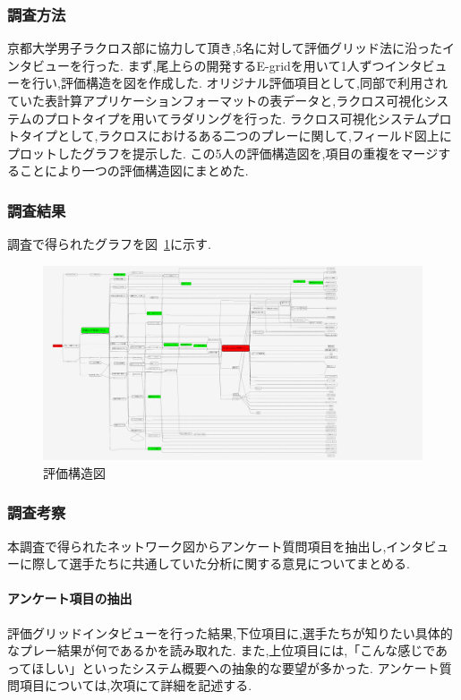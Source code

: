 \documentclass[sotsuron]{kuee}
\begin{document}
			\subsubsection{調査方法}
				京都大学男子ラクロス部に協力して頂き,5名に対して評価グリッド法に沿ったインタビューを行った.
				まず,尾上らの開発するE-gridを用いて1人ずつインタビューを行い,評価構造を図を作成した.
				オリジナル評価項目として,同部で利用されていた表計算アプリケーションフォーマットの表データと,ラクロス可視化システムのプロトタイプを用いてラダリングを行った.
				ラクロス可視化システムプロトタイプとして,ラクロスにおけるある二つのプレーに関して,フィールド図上にプロットしたグラフを提示した.
				この5人の評価構造図を,項目の重複をマージすることにより一つの評価構造図にまとめた.
			\subsubsection{調査結果}	
				調査で得られたグラフを図~\ref{fig:egrid}に示す.
					\begin{figure}
						\begin{center}
							\includegraphics[width=\linewidth,angle=90]{./png/egrid.png}
						\end{center}
						\caption{評価構造図}
				  		\label{fig:egrid}
					\end{figure}
			\subsubsection{調査考察}
				本調査で得られたネットワーク図からアンケート質問項目を抽出し,インタビューに際して選手たちに共通していた分析に関する意見についてまとめる.
				\paragraph{アンケート項目の抽出}
					評価グリッドインタビューを行った結果,下位項目に,選手たちが知りたい具体的なプレー結果が何であるかを読み取れた.
					また,上位項目には,「こんな感じであってほしい」といったシステム概要への抽象的な要望が多かった.
					アンケート質問項目については,次項にて詳細を記述する.
\end{document}
